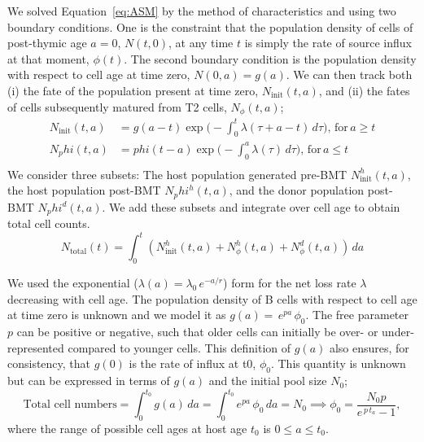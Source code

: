 \documentclass[11.5pt]{article}
\newcommand{\be}{\begin{equation}}
\newcommand{\ee}{\end{equation}}
\begin{document}
We solved Equation~\ref{eq:ASM} by the method of characteristics and using two boundary conditions. One is the constraint that the population density of cells of post-thymic age $a=0$, $N(t,0)$, at any time $t$  is simply the rate of source influx at that moment, $\phi(t)$. The second boundary condition is the population density with respect to cell age at time zero, $N(0,a) = g(a)$. We can then track both (i) the fate of the population present at time zero, $N_\text{init}(t,a)$,  and (ii) the fates of cells subsequently matured from T2 cells, $N_\phi(t,a)$;
\be
\begin{aligned} 
	N_\text{init}(t,a) &= g(a-t) \exp \bigg( - \int_0^t \lambda(\tau + a - t) \, d\tau \bigg), \, \text{for} \, a \ge t \\ 
	N_phi(t,a) &= phi(t-a) \exp \bigg (- \int_0^a \lambda(\tau) \, d\tau \bigg), \, \text{for}  \, a \le t \\ 
\end{aligned} 
\label{fig:PDEsolution}
\ee 
We consider three subsets: The host population generated pre-BMT $N_\text{init}^h (t,a)$, the host population post-BMT $N_phi^h (t,a)$, and the donor population post-BMT $N_phi^d (t,a)$. We add these subsets and integrate over cell age to obtain total cell counts.
\be
N_\text{total}(t) = \int_0^t \left ( N_\text{init}^h (t,a) + N_{\phi}^h (t,a)+ N_{\phi}^d (t, a) \right ) \, da 
\ee

We used the exponential ($\lambda(a) = \lambda_0 \, e^{-a/r}$) form for the net loss rate $\lambda$ decreasing with cell age. The population density of B cells with respect to cell age at time zero is unknown and we model it as $ g(a) = \, e^{p a} \, \phi_0 $. The free parameter $p$ can be positive or negative, such that older cells can initially be over- or under-represented compared to younger cells. This definition of $g(a)$ also ensures, for consistency, that $g(0)$ is the rate of influx at t0, $\phi_{0}$.  This quantity is unknown but can be expressed in terms of $g(a)$ and the initial pool size  $N_0$;
\be
\text{Total cell numbers} = \int_0^{t_0} g(a) \, da = \int_0^{t_0} e^{p a} \, \phi_0 \, da= N_{0} \implies   \phi_0 = \frac{N_{0} p}{e^{\,p \,t_a}-1} ,
\ee 
where the range of possible cell ages at host age $t_{0}$ is $0 \le a \le t_{0}$. 
\end{document}
